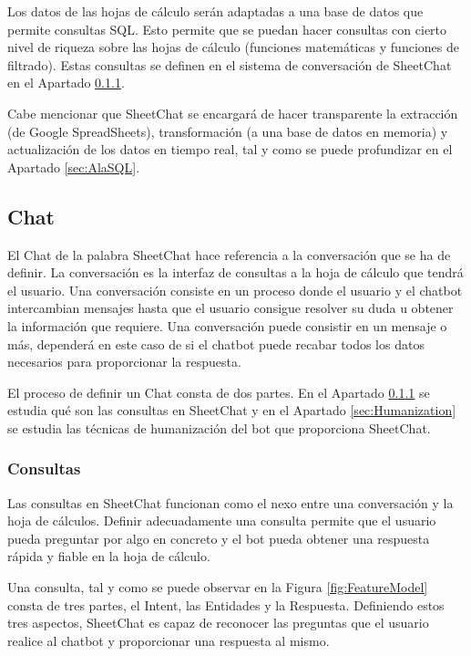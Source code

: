 Los datos de las hojas de cálculo serán adaptadas a una base de datos que permite consultas SQL. Esto permite que se puedan hacer consultas con cierto nivel de riqueza sobre las hojas de cálculo (funciones matemáticas y funciones de filtrado). Estas consultas se definen en el sistema de conversación de SheetChat en el Apartado \ref{sec:Queries}.


Cabe mencionar que SheetChat se encargará de hacer transparente la extracción (de Google SpreadSheets), transformación (a una base de datos en memoria) y actualización de los datos en tiempo real, tal y como se puede profundizar en el Apartado \ref{sec:AlaSQL}.

\subsection{Chat}
\label{sec:Chat}

El Chat de la palabra SheetChat hace referencia a la conversación que se ha de definir. La conversación es la interfaz de consultas a la hoja de cálculo que tendrá el usuario. Una conversación consiste en un proceso donde el usuario y el chatbot intercambian mensajes hasta que el usuario consigue resolver su duda u obtener la información que requiere. Una conversación puede consistir en un mensaje o más, dependerá en este caso de si el chatbot puede recabar todos los datos necesarios para proporcionar la respuesta.

El proceso de definir un Chat consta de dos partes. En el Apartado \ref{sec:Queries} se estudia qué son las consultas en SheetChat y en el Apartado \ref{sec:Humanization} se estudia las técnicas de humanización del bot que proporciona SheetChat.

\subsubsection{Consultas}
\label{sec:Queries}

Las consultas en SheetChat funcionan como el nexo entre una conversación y la hoja de cálculos. Definir adecuadamente una consulta permite que el usuario pueda preguntar por algo en concreto y el bot pueda obtener una respuesta rápida y fiable en la hoja de cálculo.

Una consulta, tal y como se puede observar en la Figura \ref{fig:FeatureModel} consta de tres partes, el Intent, las Entidades y la Respuesta. Definiendo estos tres aspectos, SheetChat es capaz de reconocer las preguntas que el usuario realice al chatbot y proporcionar una respuesta al mismo.

